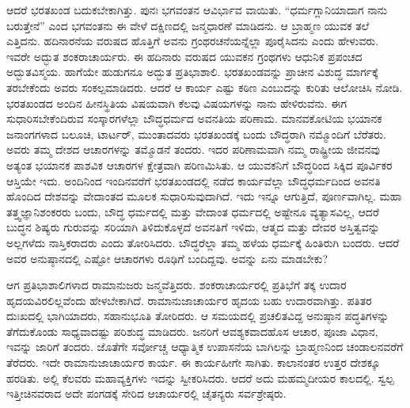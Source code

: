 ಆದರೆ ಭರತಖಂಡ ಬದುಕಬೇಕಾಗಿತ್ತು. ಪುನಃ ಭಗವಂತನ ಆವಿರ್ಭಾವ ವಾಯಿತು. “ಧರ್ಮಗ್ಲಾನಿಯಾದಾಗ ನಾನು ಬರುತ್ತೇನೆ” ಎಂದ ಭಗವಂತನು ಈ ವೇಳೆ ದಕ್ಷಿಣದಲ್ಲಿ ಜನ್ಮಧಾರಣೆ ಮಾಡಿದನು. ಆ ಬ್ರಾಹ್ಮಣ ಯುವಕ ತಲೆ ಎತ್ತಿದನು. ಹದಿನಾರನೆಯ ವರುಷದ ಹೊತ್ತಿಗೆ ಅವನು ಗ್ರಂಥರಚನೆಯನ್ನೆಲ್ಲಾ ಪೂರೈಸಿದನು ಎಂದು ಹೇಳುವರು. ಇವರೇ ಅದ್ಭುತ ಶಂಕರಾಚಾರ್ಯರು. ಈ ಹದಿನಾರು ವರುಷದ ಯುವಕನ ಗ್ರಂಥಗಳು ಆಧುನಿಕ ಪ್ರಪಂಚದ ಅದ್ಭುತವಿಸ್ಮಯ. ಹಾಗೆಯೇ ಹುಡುಗನೂ ಅದ್ಭುತ ಪ್ರತಿಭಾಶಾಲಿ. ಭರತಖಂಡವನ್ನು ಪ್ರಾಚೀನ ವಿಶುದ್ಧ ಮಾರ್ಗಕ್ಕೆ ತರಬೇಕೆಂದು ಅವರು ಸಂಕಲ್ಪಮಾಡಿದರು. ಆದರೆ ಆ ಕಾರ್ಯ ಎಷ್ಟು ಕಠಿಣ ಎಂಬುದನ್ನು ಕುರಿತು ಆಲೋಚಿಸಿ ನೋಡಿ. ಭರತಖಂಡದ ಅಂದಿನ ಹೀನಸ್ಥಿತಿಯ ವಿಷಯವಾಗಿ ಕೆಲವು ವಿಷಯಗಳನ್ನು ನಾನು ಹೇಳಿರುವೆನು. ಈಗ ಸುಧಾರಿಸಬೇಕೆಂದಿರುವ ಸಂಸ್ಕಾರಗಳೆಲ್ಲಾ ಬೌದ್ಧಧರ್ಮದ ಅವನತಿಯ ಪರಿಣಾಮ. ಮಾನವಕೋಟಿಯ ಭಯಾನಕ ಜನಾಂಗಗಳಾದ ಬಲೂಚಿ, ಟಾರ್ಟರ್​, ಮುಂತಾದವರು ಭರತಖಂಡಕ್ಕೆ ಬಂದು ಬೌದ್ಧರಾಗಿ ನಮ್ಮೊಂದಿಗೆ ಬೆರೆತರು. ಅವರು ತಮ್ಮ ದೇಶದ ಆಚಾರಗಳನ್ನು ತಮ್ಮೊಡನೆ ತಂದರು. ಇದರ ಪರಿಣಾಮವಾಗಿ ನಮ್ಮ ರಾಷ್ಟ್ರೀಯ ಜೀವನವು ಅತ್ಯಂತ ಭಯಾನಕ ಪಾಶವಿಕ ಆಚಾರಗಳ ಕ್ಷೇತ್ರವಾಗಿ ಪರಿಣಮಿಸಿತು. ಆ ಯುವಕನಿಗೆ ಬೌದ್ಧರಿಂದ ಸಿಕ್ಕಿದ ಪೂರ್ವಿಕರ ಆಸ್ತಿಯೇ ಇದು. ಅಂದಿನಿಂದ ಇಂದಿನವರೆಗೆ ಭರತಖಂಡದಲ್ಲಿ ನಡೆದ ಕಾರ್ಯವೆಲ್ಲಾ ಬೌದ್ಧಧರ್ಮದಿಂದ ಅವನತಿ ಹೊಂದಿದ ದೇಶವನ್ನು ವೇದಾಂತದ ಮೂಲಕ ಸುಧಾರಿಸುವುದಾಗಿದೆ. ಇದು ಇನ್ನೂ ಆಗುತ್ತಿದೆ, ಪೂರ್ಣವಾಗಿಲ್ಲ. ಮಹಾ ತತ್ತ್ವಜ್ಞಾನಿ\break ಶಂಕರರು ಬಂದು, ಬೌದ್ಧ ಧರ್ಮದಲ್ಲಿ ಮತ್ತು ವೇದಾಂತ ಧರ್ಮದಲ್ಲಿ ಅಷ್ಟೇನೂ ವ್ಯತ್ಯಾಸವಿಲ್ಲ, ಆದರೆ ಬುದ್ಧನ ಶಿಷ್ಯರು ಗುರುವನ್ನು ಸರಿಯಾಗಿ ತಿಳಿದುಕೊಳ್ಳದೆ ಅವನತಿಗೆ ಇಳಿದು, ಆತ್ಮದ ಮತ್ತು ದೇವರ ಅಸ್ತಿತ್ವವನ್ನು ಅಲ್ಲಗಳೆದು ನಾಸ್ತಿಕರಾದರು ಎಂದು ತೋರಿಸಿದರು. ಬೌದ್ಧರೆಲ್ಲಾ ತಮ್ಮ ಹಳೆಯ ಧರ್ಮಕ್ಕೆ ಹಿಂತಿರುಗಿ ಬಂದರು. ಆದರೆ ಅವರ ಅನುಷ್ಠಾನದಲ್ಲಿ ಎಷ್ಟೋ ಆಚಾರಗಳು ರೂಢಿಗೆ ಬಂದಿದ್ದವು. ಅವನ್ನು ಏನು ಮಾಡಬೇಕು?

ಆಗ ಪ್ರತಿಭಾಶಾಲಿಗಳಾದ ರಾಮಾನುಜರು ಜನ್ಮವೆತ್ತಿದರು. ಶಂಕರಾಚಾರ್ಯರಲ್ಲಿ ಪ್ರತಿಭೆಗೆ ತಕ್ಕ ಉದಾರ ಹೃದಯವಿರಲಿಲ್ಲವೆಂದು ಹೇಳಬೇಕಾಗಿದೆ. ರಾಮಾನುಜಾ\break ಚಾರ್ಯರ ಹೃದಯ ಬಹು ಉದಾರವಾಗಿತ್ತು. ಪತಿತರ ದುಃಖದಲ್ಲಿ ಭಾಗಿಯಾದರು, ಸಹಾನುಭೂತಿ ತೋರಿದರು. ಆ ಸಮಯದಲ್ಲಿ ಪ್ರಚಲಿತವಿದ್ದ ಅನುಷ್ಠಾನ ಪದ್ಧತಿಗಳನ್ನು ತೆಗೆದುಕೊಂಡು ಸಾಧ್ಯವಾದಷ್ಟು ಪರಿಶುದ್ಧ ಮಾಡಿದರು. ಜನರಿಗೆ ಆವಶ್ಯಕವಾದ\break ಹೊಸ ಆಚಾರ, ಪೂಜಾ ವಿಧಾನ, ಇವನ್ನು ಜಾರಿಗೆ ತಂದರು. ಜೊತೆಗೇ ಸರ್ವೋಚ್ಚ ಆಧ್ಯಾತ್ಮಿಕ ಉಪಾಸನೆಯ ಬಾಗಿಲನ್ನು ಬ್ರಾಹ್ಮಣನಿಂದ ಚಂಡಾಲನವರೆಗೆ ತೆರೆದರು. ಇದೇ ರಾಮಾನುಜಾಚಾರ್ಯರ ಕಾರ್ಯ. ಈ ಕಾರ್ಯಹೀಗೇ ಸಾಗಿತು. ಕಾಲಾನಂತರ ಉತ್ತರ ದೇಶಕ್ಕೂ ಹರಡಿತು. ಅಲ್ಲಿ ಕೆಲವರು ಮಹಾವ್ಯಕ್ತಿಗಳು ಇದನ್ನು ಸ್ವೀಕರಿಸಿದರು. ಆದರೆ ಅದು ಮಹಮ್ಮದೀಯರ ಕಾಲದಲ್ಲಿ. ಸ್ವಲ್ಪ ಇತ್ತೀಚಿನವರಾದ ಅದೇ ಪಂಗಡಕ್ಕೆ ಸೇರಿದ ಆಚಾರ್ಯರಲ್ಲಿ ಚೈತನ್ಯರು ಸರ್ವಶ್ರೇಷ್ಠರು.

